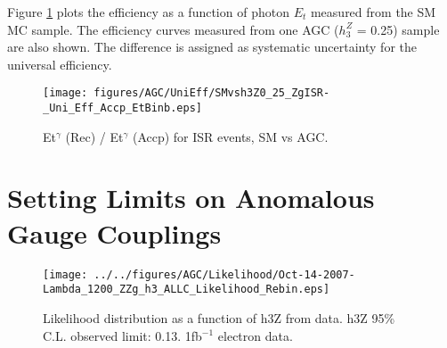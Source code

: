 \documentclass[12pt,twoside,letterpaper]{article}
\begin{document}
Figure \ref{Fig:EffSMvsAGC} plots the efficiency as a function of
photon $E_t$ measured from the SM \Zg MC sample. The efficiency curves
measured from one AGC ($h_3^Z$ = 0.25) sample are also shown. The difference
is assigned as systematic uncertainty for the universal efficiency. 

   \begin{figure}[!htbp]
   \begin{center}
       \texttt{[image: figures/AGC/UniEff/SMvsh3Z0\_25\_ZgISR-\_Uni\_Eff\_Accp\_EtBinb.eps]}
       \caption{Et$^{\gamma}$ (Rec) / Et$^{\gamma}$ (Accp) for ISR \Zg events, SM vs AGC.} 
       \label{Fig:EffSMvsAGC}
   \end{center}    
   \end{figure}


\section{Setting Limits on Anomalous Gauge Couplings}
   \begin{figure}[!htbp]
   \begin{center}
       \texttt{[image: ../../figures/AGC/Likelihood/Oct-14-2007-Lambda\_1200\_ZZg\_h3\_ALLC\_Likelihood\_Rebin.eps]}
       \caption{Likelihood distribution as a function of h3Z from data. h3Z 95\% C.L. observed limit: 0.13. 1fb$^{-1}$ electron data.}
   \label{Fig:h3ZLikelihood}
   \end{center}
   \end{figure}
\end{document}
